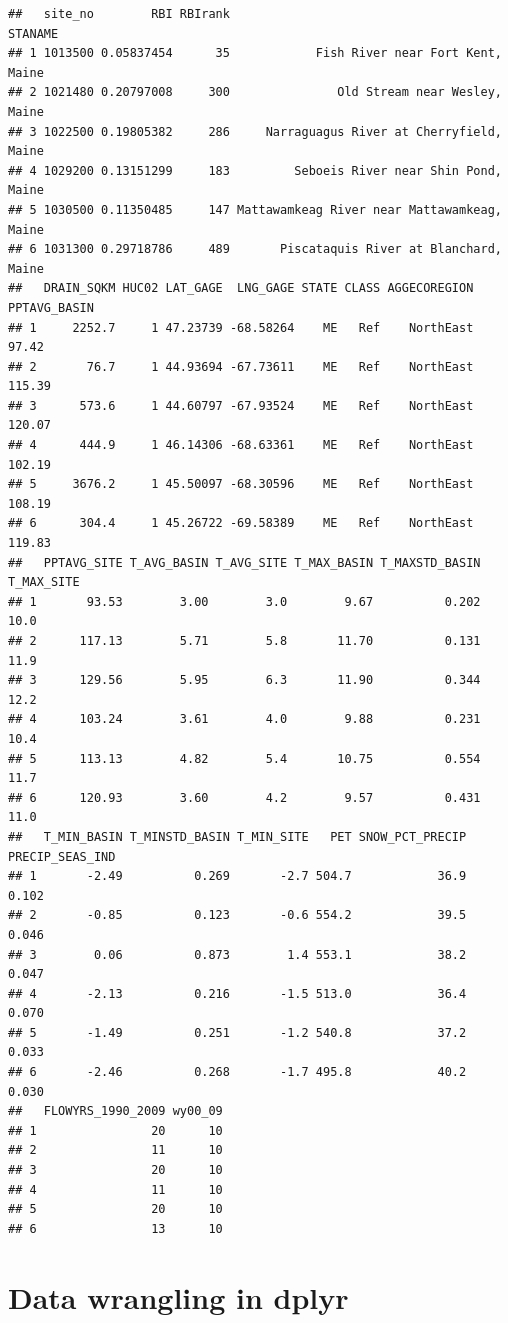 \documentclass[
]{book}
\begin{document}
\begin{verbatim}
##   site_no        RBI RBIrank                                     STANAME
## 1 1013500 0.05837454      35            Fish River near Fort Kent, Maine
## 2 1021480 0.20797008     300               Old Stream near Wesley, Maine
## 3 1022500 0.19805382     286     Narraguagus River at Cherryfield, Maine
## 4 1029200 0.13151299     183         Seboeis River near Shin Pond, Maine
## 5 1030500 0.11350485     147 Mattawamkeag River near Mattawamkeag, Maine
## 6 1031300 0.29718786     489       Piscataquis River at Blanchard, Maine
##   DRAIN_SQKM HUC02 LAT_GAGE  LNG_GAGE STATE CLASS AGGECOREGION PPTAVG_BASIN
## 1     2252.7     1 47.23739 -68.58264    ME   Ref    NorthEast        97.42
## 2       76.7     1 44.93694 -67.73611    ME   Ref    NorthEast       115.39
## 3      573.6     1 44.60797 -67.93524    ME   Ref    NorthEast       120.07
## 4      444.9     1 46.14306 -68.63361    ME   Ref    NorthEast       102.19
## 5     3676.2     1 45.50097 -68.30596    ME   Ref    NorthEast       108.19
## 6      304.4     1 45.26722 -69.58389    ME   Ref    NorthEast       119.83
##   PPTAVG_SITE T_AVG_BASIN T_AVG_SITE T_MAX_BASIN T_MAXSTD_BASIN T_MAX_SITE
## 1       93.53        3.00        3.0        9.67          0.202       10.0
## 2      117.13        5.71        5.8       11.70          0.131       11.9
## 3      129.56        5.95        6.3       11.90          0.344       12.2
## 4      103.24        3.61        4.0        9.88          0.231       10.4
## 5      113.13        4.82        5.4       10.75          0.554       11.7
## 6      120.93        3.60        4.2        9.57          0.431       11.0
##   T_MIN_BASIN T_MINSTD_BASIN T_MIN_SITE   PET SNOW_PCT_PRECIP PRECIP_SEAS_IND
## 1       -2.49          0.269       -2.7 504.7            36.9           0.102
## 2       -0.85          0.123       -0.6 554.2            39.5           0.046
## 3        0.06          0.873        1.4 553.1            38.2           0.047
## 4       -2.13          0.216       -1.5 513.0            36.4           0.070
## 5       -1.49          0.251       -1.2 540.8            37.2           0.033
## 6       -2.46          0.268       -1.7 495.8            40.2           0.030
##   FLOWYRS_1990_2009 wy00_09
## 1                20      10
## 2                11      10
## 3                20      10
## 4                11      10
## 5                20      10
## 6                13      10
\end{verbatim}

\hypertarget{data-wrangling-in-dplyr}{%
\section{Data wrangling in dplyr}\label{data-wrangling-in-dplyr}}
\end{document}
